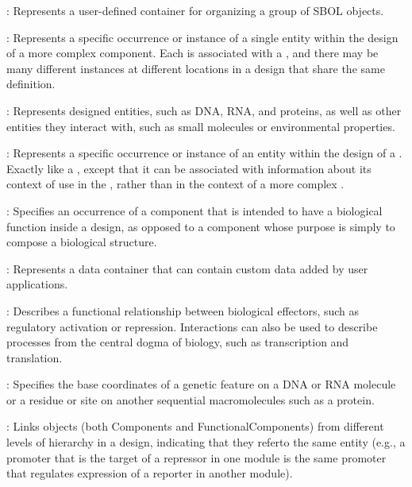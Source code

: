 \begin{description}

\item \emph{}:
Represents a user-defined container for organizing a group of SBOL objects.

\item \emph{}:
Represents a specific occurrence or instance of a single entity within the design of a more complex component.
Each  is associated with a , and there may be many different instances at different locations in a design that share the same definition.

\item \emph{}: Represents designed entities, such as DNA, RNA, and proteins, as well as other entities they interact with, such as small molecules or environmental properties.

\item \emph{}:
Represents a specific occurrence or instance of an entity within the design of a .
Exactly like a , except that it can be associated with information about its context of use in the , rather than in the context of a more complex .

\item \emph{}:
Specifies an occurrence of a component that is intended to have a biological function inside a design, as opposed to a component whose purpose is simply to compose a biological structure. 

\item \emph{}:
Represents a data container that can contain custom data added by user applications.

\item \emph{}:
Describes a functional relationship between biological effectors, such as regulatory activation or repression.  Interactions can also be used to describe processes from the central dogma of biology, such as transcription and translation.

\item \emph{}:
Specifies the base coordinates of a genetic feature on a DNA or RNA molecule or a residue or site on another sequential macromolecules such as a protein.

\item \emph{}:
Links  objects (both Components and FunctionalComponents) from different levels of hierarchy in a design, indicating that they referto the same entity (e.g., a promoter that is the target of a repressor in one module is the same promoter that regulates expression of a reporter in another module).


\end{description}
